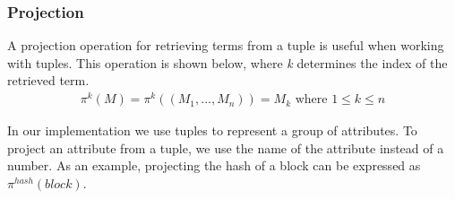 \subsubsection{Projection}
A projection operation for retrieving terms from a tuple is useful when working with tuples. This operation is shown below, where \textit{k} determines the index of the retrieved term.
\begin{align*}
    \tag{Projection}\pi^k(M)=\pi^k((M_1,..., M_n))=M_k \text{ where } 1\leq k \leq n
\end{align*}


In our implementation we use tuples to represent a group of attributes. To project an attribute from a tuple, we use the name of the attribute instead of a number. As an example, projecting the hash of a block can be expressed as $\pi^{hash}(block)$.
\FloatBarrier
